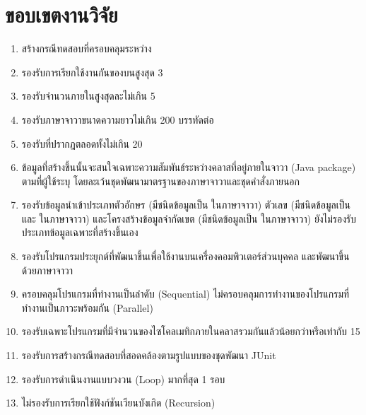 \section{ขอบเขตงานวิจัย}
\label{sec:limitation}

\begin{enumerate}
    \label{enu:limitation}
    \item สร้างกรณีทดสอบที่ครอบคลุม{\TestPath}ระหว่าง{\CUT} \label{enu:lim:tc}
    \item รองรับการเรียกใช้งานกันของ{\CUT}บน{\TestPath}สูงสุด 3 {\class} \label{enu:lim:3linkingclass}
    \item รองรับจำนวน{\method}ภายใน{\CUT}สูงสุด{\class}ละไม่เกิน 5 {\method} \label{enu:lim:5methods}
    \item รองรับ{\class}ภาษาจาวาขนาดความยาวไม่เกิน 200 บรรทัดต่อ{\class} \label{enu:lim:200loc} 
    \item รองรับ{\TestPath}ที่ปรากฎ{\PredicateNode}ตลอดทั้ง{\Path}ไม่เกิน 20 {\Node}  \label{enu:lim:20predicate}
    \item ข้อมูล{\scg}ที่สร้างขึ้นนั้นจะสนใจเฉพาะความสัมพันธ์ระหว่างคลาสที่อยู่ภายใน{\Package}จาวา (Java package) ตามที่ผู้ใช้ระบุ 
        โดยละเว้นชุดพัฒนามาตรฐานของภาษาจาวาและชุดคำสั่งภายนอก \label{enu:lim:scg}
    \item รองรับข้อมูลนำเข้าประเภทตัวอักษร (มีชนิดข้อมูลเป็น  ในภาษาจาวา) ตัวเลข 
        (มีชนิดข้อมูลเป็น  และ  ในภาษาจาวา) และโครงสร้างข้อมูลจำกัดเขต (มีชนิดข้อมูลเป็น  ในภาษาจาวา) 
        ยังไม่รองรับประเภทข้อมูลเฉพาะที่สร้างขึ้นเอง \label{enu:lim:datatype}
    \item รองรับโปรแกรมประยุกต์ที่พัฒนาขึ้นเพื่อใช้งานบนเครื่องคอมพิวเตอร์ส่วนบุคคล และ{\sourcecode}พัฒนาขึ้นด้วยภาษาจาวา  \label{enu:lim:datatype}
    \item ครอบคลุมโปรแกรมที่ทำงานเป็นลำดับ (Sequential) ไม่ครอบคลุมการทำงานของโปรแกรมที่ทำงานเป็นภาวะพร้อมกัน (Parallel) \label{enu:lim:seq}
    \item รองรับเฉพาะโปรแกรมที่มีจำนวนของไซโคลเมทิกภายในคลาสรวมกันแล้วน้อยกว่าหรือเท่ากับ 15
    \item รองรับการสร้างกรณีทดสอบที่สอดคล้องตามรูปแบบของชุดพัฒนา JUnit
    \item รองรับการดำเนินงานแบบวงวน (Loop) มากที่สุด 1 รอบ \label{enu:lim:loop}
    \item ไม่รองรับการเรียกใช้ฟังก์ชันเวียนบังเกิด (Recursion)
\end{enumerate}
